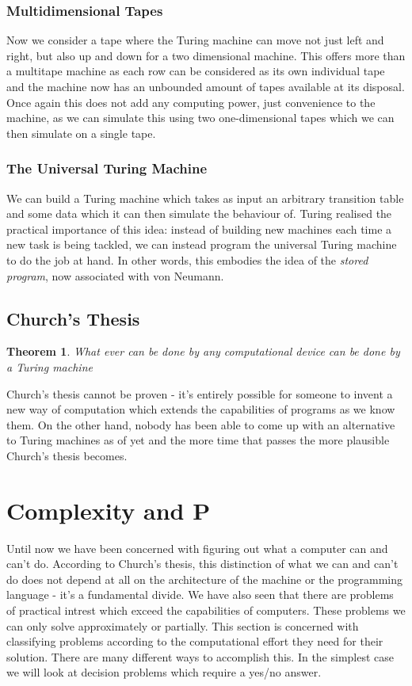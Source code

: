 \documentclass[11pt]{article}
\newtheorem{theorem}{Theorem}
\begin{document}
	\subsubsection{Multidimensional Tapes}
	Now we consider a tape where the Turing machine can move not just left and right, but also up and down for a two dimensional machine. This offers more than a multitape machine as each row can be considered as its own individual tape and the machine now has an unbounded amount of tapes available at its disposal. Once again this does not add any computing power, just convenience to the machine, as we can simulate this using two one-dimensional tapes which we can then simulate on a single tape.
	
	
	\subsubsection{The Universal Turing Machine}
	We can build a Turing machine which takes as input an arbitrary transition table and some data which it can then simulate the behaviour of. Turing realised the practical importance of this idea: instead of building new machines each time a new task is being tackled, we can instead program the universal Turing machine to do the job at hand. In other words, this embodies the idea of the \textit{stored program}, now associated with von Neumann. 
	
	\subsection{Church's Thesis}
	\begin{theorem} 
		What ever can be done by any computational device can be done by a Turing machine
	\end{theorem}
	
	\par Church's thesis cannot be proven - it's entirely possible for someone to invent a new way of computation which extends the capabilities of programs as we know them. On the other hand, nobody has been able to come up with an alternative to Turing machines as of yet and the more time that passes the more plausible Church's thesis becomes.
	
	\section{Complexity and P}
	Until now we have been concerned with figuring out what a computer can and can't do. According to Church's thesis, this distinction of what we can and can't do does not depend at all on the architecture of the machine or the programming language - it's a fundamental divide. We have also seen that there are problems of practical intrest which exceed the capabilities of computers. These problems we can only solve approximately or partially. This section is concerned with classifying problems according to the computational effort they need for their solution. There are many different ways to accomplish this. In the simplest case we will look at decision problems which require a yes/no answer.
	
\end{document}
